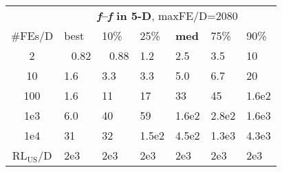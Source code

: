 \begin{tabular}{c|llllll}
 & \multicolumn{6}{|c}{\textbf{\textit{f}\raisebox{-0.35ex}{1}--\textit{f}\raisebox{-0.35ex}{24} in 5-D}, maxFE/D=2080}\\
\#FEs/D & best & 10\% & 25\% & \textbf{med} & 75\% & 90\%\\
2 & ~\,0.82 & ~\,0.88 & \hspace*{1ex}1.2 & \hspace*{1ex}2.5 & \hspace*{1ex}3.5 & 10\\
10 & \hspace*{1ex}1.6 & \hspace*{1ex}3.3 & \hspace*{1ex}3.3 & \hspace*{1ex}5.0 & \hspace*{1ex}6.7 & 20\\
100 & \hspace*{1ex}1.6 & 11 & 17 & 33 & 45 & 1.6e2\\
1e3 & \hspace*{1ex}6.0 & 40 & 59 & 1.6e2 & 2.8e2 & 1.6e3\\
1e4 & 31 & 32 & 1.5e2 & 4.5e2 & 1.3e3 & 4.3e3\\
$\text{RL}_{\text{US}}$/D & 2e3 & 2e3 & 2e3 & 2e3 & 2e3 & 2e3
\end{tabular}
